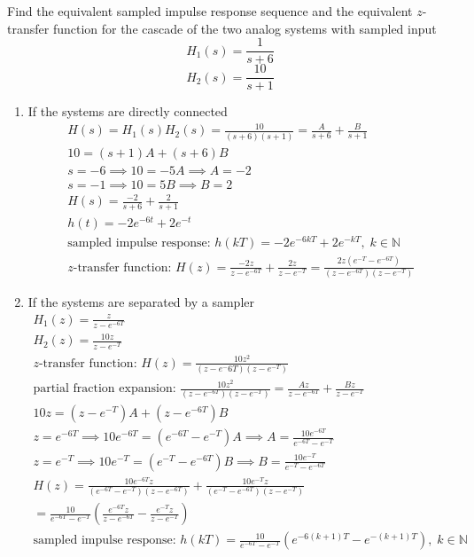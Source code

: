 \documentclass[12pt]{article}
\newcommand{\N}{\mathbb{N}}
\newenvironment{problem}[2][Problem]{\begin{trivlist}
\item[\hskip \labelsep {\bfseries #1}\hskip \labelsep {\bfseries #2.}]}{\end{trivlist}}
\begin{document}
\pagebreak
\begin{problem}{4}
  Find the equivalent sampled impulse response sequence and the equivalent $z$-transfer function for the cascade of the two analog systems with sampled input
  $$H_1(s) = \frac{1}{s+6}$$
  $$H_2(s) = \frac{10}{s+1}$$
  \begin{enumerate}[label=\alph*.]
    \item If the systems are directly connected
    \begin{align*}
      H(s) = H_1(s)H_2(s) = \frac{10}{(s+6)(s+1)} = \frac{A}{s+6} + \frac{B}{s+1}\\
      10 = (s+1)A + (s+6)B\\
      s= -6 \implies 10 = -5A \implies A = -2\\
      s=-1 \implies 10 = 5B \implies B = 2\\
      H(s) = \frac{-2}{s+6} + \frac{2}{s+1}\\
      h(t) = -2e^{-6t} + 2e^{-t}\\
      \text{sampled impulse response: } h(kT) = -2e^{-6kT} + 2e^{-kT},\;k\in\N\\
      \text{$z$-transfer function: } H(z) = \frac{-2z}{z-e^{-6T}} + \frac{2z}{z-e^{-T}} = \frac{2z(e^{-T} - e^{-6T})}{(z-e^{-6T})(z-e^{-T})}
    \end{align*} 
    \item If the systems are separated by a sampler
    \begin{align*}
      H_1(z) = \frac{z}{z-e^{-6T}}\\
      H_2(z) = \frac{10z}{z-e^{-T}}\\
      \text{$z$-transfer function: } H(z) = \frac{10z^2}{(z-e^-6T)(z-e^{-T})}\\
      \text{partial fraction expansion: }\frac{10z^2}{(z-e^{-6T})(z-e^{-T})} = \frac{Az}{z-e^{-6T}}+\frac{Bz}{z-e^{-T}}\\
      10z = (z-e^{-T})A + (z-e^{-6T})B\\
      z=e^{-6T} \implies 10e^{-6T} = (e^{-6T} - e^{-T})A \implies A = \frac{10e^{-6T}}{e^{-6T}-e^{-T}}\\
      z=e^{-T} \implies 10e^{-T} = (e^{-T} - e^{-6T})B \implies B = \frac{10e^{-T}}{e^{-T} - e^{-6T}}\\
      H(z) = \frac{10e^{-6T}z}{(e^{-6T}-e^{-T})(z-e^{-6T})}+\frac{10e^{-T}z}{(e^{-T}-e^{-6T})(z-e^{-T})}\\
      = \frac{10}{e^{-6T}-e^{-T}}\left(\frac{e^{-6T}z}{z-e^{-6T}}-\frac{e^{-T}z}{z-e^{-T}}\right)\\
      \text{sampled impulse response: } h(kT) = \frac{10}{e^{-6T} - e^{-T}}(e^{-6(k+1)T}-e^{-(k+1)T}),\;k\in\N
    \end{align*} 
  \end{enumerate}
\end{problem}
 
\end{document}
